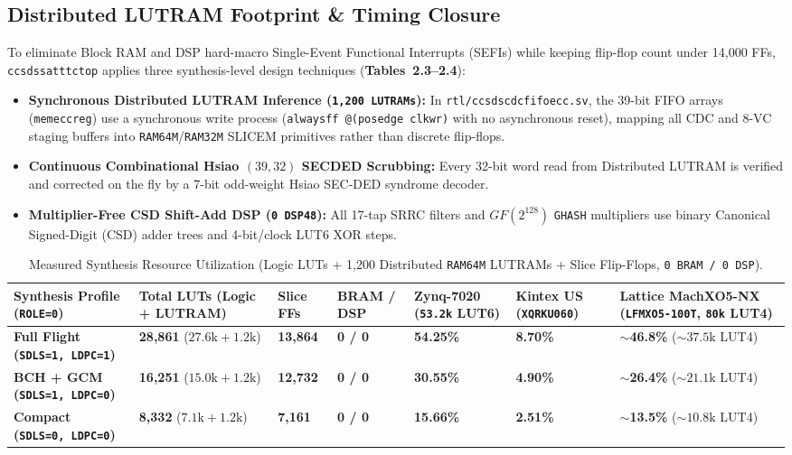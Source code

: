 \documentclass[10pt,a4paper]{article}
\renewcommand{\_}{\origunderscore\penalty0\hskip0pt\relax}
\numberwithin{table}{section}
\numberwithin{figure}{section}
\numberwithin{equation}{section}
\begin{document}
\subsection{Distributed LUTRAM Footprint \& Timing Closure}
To eliminate Block RAM and DSP hard-macro Single-Event Functional Interrupts (SEFIs) while keeping flip-flop count under 14,000 FFs, \texttt{ccsds\_sat\_ttc\_top} applies three synthesis-level design techniques (\textbf{Tables~2.3--2.4}):
\begin{itemize}\setlength{\itemsep}{2pt}
    \item \textbf{Synchronous Distributed LUTRAM Inference (\texttt{1,200 LUTRAMs}):} In \texttt{rtl/ccsds\_cdc\_fifo\_ecc.sv}, the 39-bit FIFO arrays (\texttt{mem\_ecc\_reg}) use a synchronous write process (\texttt{always\_ff @(posedge clk\_wr)} with no asynchronous reset), mapping all CDC and 8-VC staging buffers into \texttt{RAM64M}/\texttt{RAM32M} SLICEM primitives rather than discrete flip-flops.
    \item \textbf{Continuous Combinational Hsiao $(39,32)$ SECDED Scrubbing:} Every 32-bit word read from Distributed LUTRAM is verified and corrected on the fly by a 7-bit odd-weight Hsiao SEC-DED syndrome decoder.
    \item \textbf{Multiplier-Free CSD Shift-Add DSP (\texttt{0 DSP48}):} All 17-tap SRRC filters and $GF(2^{128})$ \texttt{GHASH} multipliers use binary Canonical Signed-Digit (CSD) adder trees and 4-bit/clock LUT6 XOR steps.
\end{itemize}

\begin{table}[htbp]
\centering
\scriptsize
\renewcommand{\arraystretch}{1.18}
\begin{tabularx}{\textwidth}{@{}L{1.52in}C{0.78in}C{0.58in}C{0.58in}C{0.62in}C{0.68in}Y@{}}
\toprule
\textbf{Synthesis Profile (\texttt{ROLE=0})} & \textbf{Total LUTs (Logic + LUTRAM)} & \textbf{Slice FFs} & \textbf{BRAM / DSP} & \textbf{Zynq-7020 (\texttt{53.2k} LUT6)} & \textbf{Kintex US (\texttt{XQRKU060})} & \textbf{Lattice MachXO5-NX (\texttt{LFMXO5-100T}, \texttt{80k} LUT4)} \\
\midrule
\textbf{Full Flight (\texttt{SDLS=1, LDPC=1})} & \textbf{28,861} ($27.6\text{k} + 1.2\text{k}$) & \textbf{13,864} & \textbf{0 / 0} & \textbf{54.25\%} & \textbf{8.70\%} & \textbf{$\sim$46.8\%} ($\sim 37.5\text{k}$ LUT4) \\
\textbf{BCH + GCM (\texttt{SDLS=1, LDPC=0})} & \textbf{16,251} ($15.0\text{k} + 1.2\text{k}$) & \textbf{12,732} & \textbf{0 / 0} & \textbf{30.55\%} & \textbf{4.90\%} & \textbf{$\sim$26.4\%} ($\sim 21.1\text{k}$ LUT4) \\
\textbf{Compact (\texttt{SDLS=0, LDPC=0})} & \textbf{8,332} ($7.1\text{k} + 1.2\text{k}$) & \textbf{7,161} & \textbf{0 / 0} & \textbf{15.66\%} & \textbf{2.51\%} & \textbf{$\sim$13.5\%} ($\sim 10.8\text{k}$ LUT4) \\
\bottomrule
\end{tabularx}
\caption{\footnotesize Measured Synthesis Resource Utilization (Logic LUTs + 1,200 Distributed \texttt{RAM64M} LUTRAMs + Slice Flip-Flops, \texttt{0 BRAM / 0 DSP}).}
\end{table}
\end{document}
